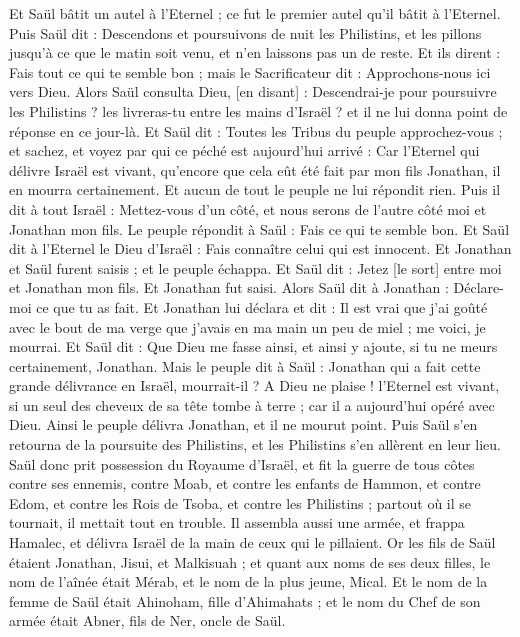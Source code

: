 \begin{multicols}{2}
Et Saül bâtit un autel à l'Eternel ; ce fut le premier autel qu'il bâtit à l'Eternel.
Puis Saül dit : Descendons et poursuivons de nuit les Philistins, et les pillons jusqu'à ce que le matin soit venu, et n'en laissons pas un de reste. Et ils dirent : Fais tout ce qui te semble bon ; mais le Sacrificateur dit : Approchons-nous ici vers Dieu.
Alors Saül consulta Dieu, [en disant] : Descendrai-je pour poursuivre les Philistins ? les livreras-tu entre les mains d'Israël ? et il ne lui donna point de réponse en ce jour-là.
Et Saül dit : Toutes les Tribus du peuple approchez-vous ; et sachez, et voyez par qui ce péché est aujourd'hui arrivé :
Car l'Eternel qui délivre Israël est vivant, qu'encore que cela eût été fait par mon fils Jonathan, il en mourra certainement. Et aucun de tout le peuple ne lui répondit rien.
Puis il dit à tout Israël : Mettez-vous d'un côté, et nous serons de l'autre côté moi et Jonathan mon fils. Le peuple répondit à Saül : Fais ce qui te semble bon.
Et Saül dit à l'Eternel le Dieu d'Israël : Fais connaître celui qui est innocent. Et Jonathan et Saül furent saisis ; et le peuple échappa.
Et Saül dit : Jetez [le sort] entre moi et Jonathan mon fils. Et Jonathan fut saisi.
Alors Saül dit à Jonathan : Déclare-moi ce que tu as fait. Et Jonathan lui déclara et dit : Il est vrai que j'ai goûté avec le bout de ma verge que j'avais en ma main un peu de miel ; me voici, je mourrai.
Et Saül dit : Que Dieu me fasse ainsi, et ainsi y ajoute, si tu ne meurs certainement, Jonathan.
Mais le peuple dit à Saül : Jonathan qui a fait cette grande délivrance en Israël, mourrait-il ? A Dieu ne plaise ! l'Eternel est vivant, si un seul des cheveux de sa tête tombe à terre ; car il a aujourd'hui opéré avec Dieu. Ainsi le peuple délivra Jonathan, et il ne mourut point.
Puis Saül s'en retourna de la poursuite des Philistins, et les Philistins s'en allèrent en leur lieu.
Saül donc prit possession du Royaume d'Israël, et fit la guerre de tous côtes contre ses ennemis, contre Moab, et contre les enfants de Hammon, et contre Edom, et contre les Rois de Tsoba, et contre les Philistins ; partout où il se tournait, il mettait tout en trouble.
Il assembla aussi une armée, et frappa Hamalec, et délivra Israël de la main de ceux qui le pillaient.
Or les fils de Saül étaient Jonathan, Jisui, et Malkisuah ; et quant aux noms de ses deux filles, le nom de l'aînée était Mérab, et le nom de la plus jeune, Mical.
Et le nom de la femme de Saül était Ahinoham, fille d'Ahimahats ; et le nom du Chef de son armée était Abner, fils de Ner, oncle de Saül.

\end{multicols}
